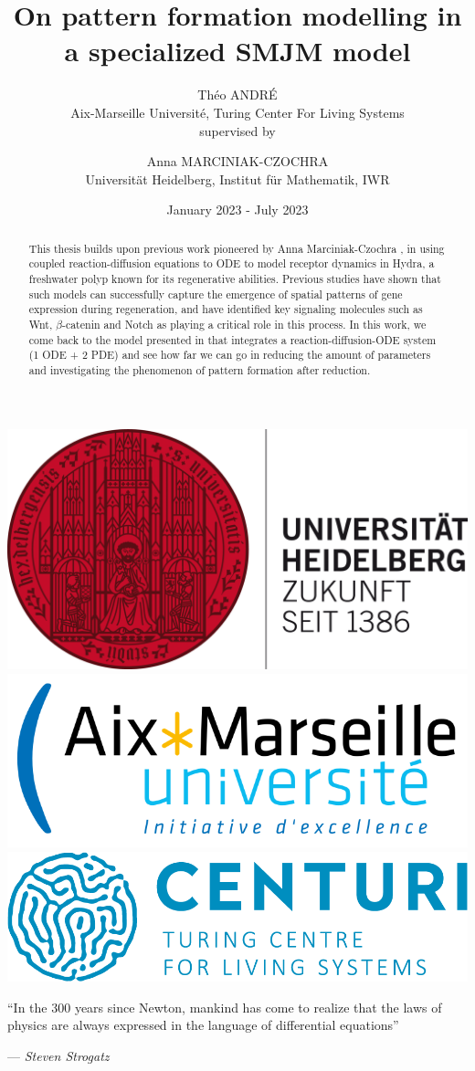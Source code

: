 \documentclass[12pt]{article}
\title{\textbf{On pattern formation modelling in a specialized SMJM model}}
\author{Théo ANDRÉ \\ Aix-Marseille Université, Turing Center For Living Systems \vspace{1em} \\   \vspace{1em} \small{supervised by} \and Anna MARCINIAK-CZOCHRA \\ Universität Heidelberg, Institut für Mathematik, IWR}
\date{January 2023 - July 2023}
\begin{document}
\maketitle

%

\vfill
\begin{abstract}
This thesis builds upon previous work pioneered by Anna Marciniak-Czochra \cite{AnnaThesis}, in using coupled reaction-diffusion equations to ODE to model receptor dynamics in Hydra, a freshwater polyp known for its regenerative abilities. Previous studies have shown that such models can successfully capture the emergence of spatial patterns of gene expression during regeneration, and have identified key signaling molecules such as Wnt, $\beta$-catenin and Notch as playing a critical role in this process. In this work, we come back to the model presented in \cite{AnnaThesis} that integrates a  reaction-diffusion-ODE system (1 ODE + 2 PDE) and see how far we can go in reducing the amount of parameters and investigating the phenomenon of pattern formation after reduction.
\end{abstract}

\vfill

\centering
\includegraphics[width=0.23\linewidth]{figures/uni_heidelberg_logo.png}
\hfill
\includegraphics[width=0.3\linewidth]{figures/AMULOGO.png}
\hfill
\includegraphics[width=0.32\linewidth]{figures/centurilogo.png}

\justifying


\newpage

\tableofcontents
\bigskip\bigskip

\newpage



		\epigraph{``In the 300 years since Newton, mankind has come to realize that the laws of physics are always expressed in the language of differential equations''}{--- \textit{Steven Strogatz}}
\end{document}
